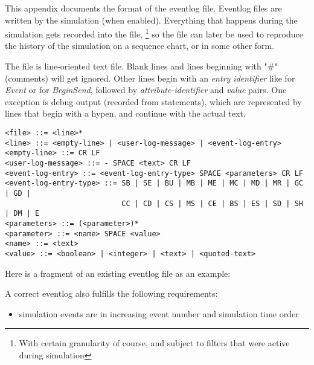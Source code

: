 \label{cha:eventlog-file-format}

This appendix documents the format of the eventlog file. Eventlog
files are written by the simulation (when enabled). Everything
that happens during the simulation gets recorded into the file,
  \footnote{With certain granularity of course, and subject to
  filters that were active during simulation}
so the file can later be used to reproduce the history of the
simulation on a sequence chart, or in some other form.

The file is line-oriented text file. Blank lines and lines beginning
with "\#" (comments) will get ignored. Other lines begin with an
\textit{entry identifier} like  for \textit{Event} or
 for \textit{BeginSend}, followed by \textit{attribute-identifier}
and \textit{value} pairs. One exception is debug output
(recorded from  statements), which are represented
by lines that begin with a hypen, and continue with the actual text.

\begin{verbatim}
<file> ::= <line>*
<line> ::= <empty-line> | <user-log-message> | <event-log-entry>
<empty-line> ::= CR LF
<user-log-message> ::= - SPACE <text> CR LF
<event-log-entry> ::= <event-log-entry-type> SPACE <parameters> CR LF
<event-log-entry-type> ::= SB | SE | BU | MB | ME | MC | MD | MR | GC | GD |
                           CC | CD | CS | MS | CE | BS | ES | SD | SH | DM | E
<parameters> ::= (<parameter>)*
<parameter> ::= <name> SPACE <value>
<name> ::= <text>
<value> ::= <boolean> | <integer> | <text> | <quoted-text>
\end{verbatim}

Here is a fragment of an existing eventlog file as an example:


A correct eventlog also fulfills the following requirements:
\begin{itemize}
   \item simulation events are in increasing event number and simulation time order
\end{itemize}

